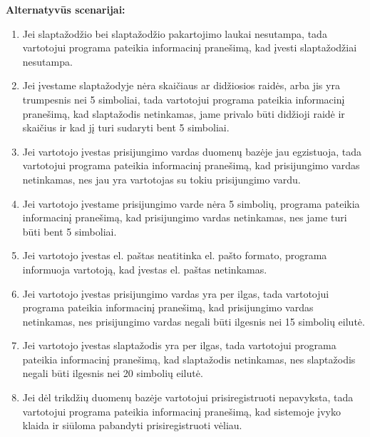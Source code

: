 \documentclass{VUMIFPSkursinis}
\begin{document}
	\textbf{Alternatyvūs scenarijai:}
	\begin{enumerate}[itemsep=-2mm]
		\item Jei slaptažodžio bei slaptažodžio pakartojimo laukai nesutampa, tada vartotojui programa pateikia informacinį pranešimą, kad įvesti slaptažodžiai nesutampa.
		\item Jei įvestame slaptažodyje nėra skaičiaus ar didžiosios raidės, arba jis yra trumpesnis nei 5 simboliai, tada vartotojui programa pateikia informacinį pranešimą, kad slaptažodis netinkamas, jame privalo būti didžioji raidė ir skaičius ir kad jį turi sudaryti bent 5 simboliai.
		\item Jei vartotojo įvestas prisijungimo vardas duomenų bazėje jau egzistuoja, tada vartotojui programa pateikia informacinį pranešimą, kad prisijungimo vardas netinkamas, nes jau yra vartotojas su tokiu prisijungimo vardu.
		\item Jei vartotojo įvestame prisijungimo varde nėra 5 simbolių, programa pateikia informacinį pranešimą, kad prisijungimo vardas netinkamas, nes jame turi būti bent 5 simboliai.
		\item Jei vartotojo įvestas el. paštas neatitinka el. pašto formato, programa informuoja vartotoją, kad įvestas el. paštas netinkamas.
		\item Jei vartotojo įvestas prisijungimo vardas yra per ilgas, tada vartotojui programa pateikia informacinį pranešimą, kad prisijungimo vardas netinkamas, nes prisijungimo vardas negali būti ilgesnis nei 15 simbolių eilutė.
		\item Jei  vartotojo įvestas slaptažodis yra per ilgas, tada vartotojui programa pateikia informacinį pranešimą, kad slaptažodis netinkamas, nes slaptažodis negali būti ilgesnis nei 20 simbolių eilutė.
		\item Jei dėl trikdžių duomenų bazėje vartotojui prisiregistruoti nepavyksta, tada vartotojui programa pateikia informacinį pranešimą, kad sistemoje įvyko klaida ir siūloma pabandyti prisiregistruoti vėliau.
	\end{enumerate} 
\end{document}
